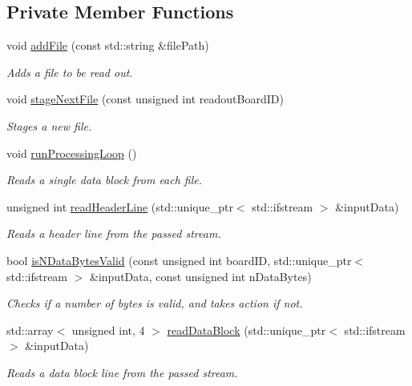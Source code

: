 \subsection*{Private Member Functions}
\begin{DoxyCompactItemize}
\item 
void \hyperlink{class_file_reader_a3404694daef538fdd001a3e2ae898fb8}{add\+File} (const std\+::string \&file\+Path)
\begin{DoxyCompactList}\small\item\em Adds a file to be read out. \end{DoxyCompactList}\item 
void \hyperlink{class_file_reader_a381cceb460883f24a8113333ae1bf5bb}{stage\+Next\+File} (const unsigned int readout\+Board\+ID)
\begin{DoxyCompactList}\small\item\em Stages a new file. \end{DoxyCompactList}\item 
void \hyperlink{class_file_reader_a98606ec7d315f1ed6f90c531df0d09f9}{run\+Processing\+Loop} ()
\begin{DoxyCompactList}\small\item\em Reads a single data block from each file. \end{DoxyCompactList}\item 
unsigned int \hyperlink{class_file_reader_a94181d78b29ebacf2a4b3b3cd03a6750}{read\+Header\+Line} (std\+::unique\+\_\+ptr$<$ std\+::ifstream $>$ \&input\+Data)
\begin{DoxyCompactList}\small\item\em Reads a header line from the passed stream. \end{DoxyCompactList}\item 
bool \hyperlink{class_file_reader_ac3938817d6fd8b2d90ac479e323bdc03}{is\+N\+Data\+Bytes\+Valid} (const unsigned int board\+ID, std\+::unique\+\_\+ptr$<$ std\+::ifstream $>$ \&input\+Data, const unsigned int n\+Data\+Bytes)
\begin{DoxyCompactList}\small\item\em Checks if a number of bytes is valid, and takes action if not. \end{DoxyCompactList}\item 
std\+::array$<$ unsigned int, 4 $>$ \hyperlink{class_file_reader_ac578b683eba751027766a2c30f03a28b}{read\+Data\+Block} (std\+::unique\+\_\+ptr$<$ std\+::ifstream $>$ \&input\+Data)
\begin{DoxyCompactList}\small\item\em Reads a data block line from the passed stream. \end{DoxyCompactList}\end{DoxyCompactItemize}
